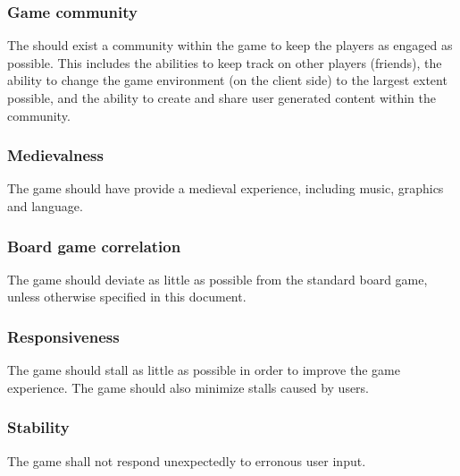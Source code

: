 
\subsubsection{Game community}
The should exist a community within the game to keep the players as engaged as possible. This includes the abilities to keep track on other players (friends), the ability to change the game environment (on the client side) to the largest extent possible, and the ability to create and share user generated content within the community.


\subsubsection{Medievalness}
The game should have provide a medieval experience, including music, graphics and language.


\subsubsection{Board game correlation}
\label{req:boardgamecorrelation}
The game should deviate as little as possible from the standard board game, unless otherwise specified in this document.



\subsubsection{Responsiveness}
The game should stall as little as possible in order to improve the game experience. The game should also minimize stalls caused by users.


\subsubsection{Stability}
The game shall not respond unexpectedly to erronous user input.

